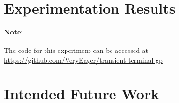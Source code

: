 \documentclass[a4paper]{article}
\begin{document}
\section{Experimentation Results}
\paragraph{Note:} The code for this experiment can be accessed at \url{https://github.com/VeryEager/transient-terminal-gp}

\section{Intended Future Work}
\end{document}
